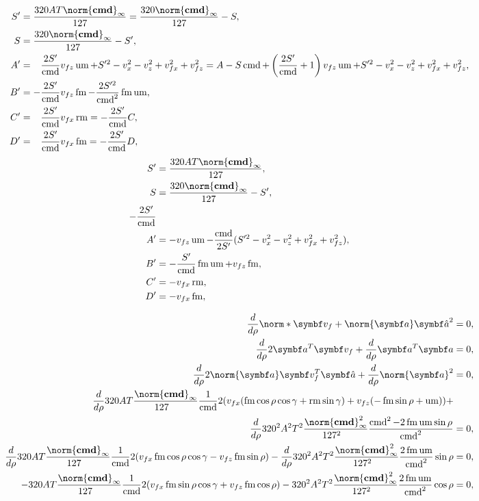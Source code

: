 \begin{align*}
S' &= \frac{320AT\norm{\tvec{\cmd}}_{\infty}}{127} = \frac{320\norm{\tvec{\cmd}}_{\infty}}{127} - S,\\
S &= \frac{320\norm{\tvec{\cmd}}_{\infty}}{127} - S',\\
A' &= \hphantom{-}\frac{2S'}{\cmd}v_{fz}\umove + S'^2 - v_x^2 - v_z^2 + v_{fx}^2 + v_{fz}^2 = A - S\cmd + \left(\frac{2S'}{\cmd} + 1\right)v_{fz}\umove + S'^2 - v_x^2 - v_z^2 + v_{fx}^2 + v_{fz}^2,\\
B' &= -\frac{2S'}{\cmd}v_{fz}\fmove - \frac{2S'^2}{\cmd^2}\fmove\umove,\\
C' &= \hphantom{-}\frac{2S'}{\cmd}v_{fx}\rmove = -\frac{2S'}{\cmd}C,\\
D' &= \hphantom{-}\frac{2S'}{\cmd}v_{fx}\fmove = -\frac{2S'}{\cmd}D,
\end{align*}
\begin{align*}
S' &= \frac{320AT\norm{\tvec{\cmd}}_{\infty}}{127},\\
S &= \frac{320\norm{\tvec{\cmd}}_{\infty}}{127} - S',\\
-\frac{2S'}{\cmd}\\
A' &= -v_{fz}\umove - \frac{\cmd}{2S'}(S'^2 - v_x^2 - v_z^2 + v_{fx}^2 + v_{fz}^2),\\
B' &= -\frac{S'}{\cmd}\fmove\umove + v_{fz}\fmove,\\
C' &= -v_{fx}\rmove,\\
D' &= -v_{fx}\fmove,
\end{align*}

\begin{align*}
\frac{\diff}{\diff\rho}\norm*{\vec{v}_f + \norm{\vec{a}}\uvec{a}}^2 &= 0,\\
\frac{\diff}{\diff\rho}2\vec{a}^T \vec{v}_f + \frac{\diff}{\diff\rho}\vec{a}^T \vec{a} &= 0,\\
\frac{\diff}{\diff\rho}2\norm{\vec{a}} \vec{v}_f^T \uvec{a} + \frac{\diff}{\diff\rho}\norm{\vec{a}}^2 &= 0,\\
\frac{\diff}{\diff\rho}320AT\frac{\norm{\tvec{\cmd}}_{\infty}}{127\hphantom{_{\infty}}} \frac{1}{\cmd}2 (v_{fx}(\fmove \cos\rho\cos\gamma + \rmove \sin\gamma) + v_{fz}(-\fmove \sin\rho + \umove) ) +\\
\frac{\diff}{\diff\rho}320^2 A^2 T^2\frac{\norm{\tvec{\cmd}}^2_{\infty}}{127^2\hphantom{_{\infty}}} \frac{\cmd^2  - 2\fmove\umove\sin\rho}{\cmd^2} &= 0,\\
%
\frac{\diff}{\diff\rho}320AT\frac{\norm{\tvec{\cmd}}_{\infty}}{127\hphantom{_{\infty}}} \frac{1}{\cmd}2 (v_{fx}\fmove \cos\rho\cos\gamma - v_{fz}\fmove \sin\rho ) - \frac{\diff}{\diff\rho}320^2 A^2 T^2\frac{\norm{\tvec{\cmd}}^2_{\infty}}{127^2\hphantom{_{\infty}}} \frac{2\fmove\umove}{\cmd^2}\sin\rho &= 0,\\
-320AT\frac{\norm{\tvec{\cmd}}_{\infty}}{127\hphantom{_{\infty}}} \frac{1}{\cmd}2 (v_{fx}\fmove \sin\rho\cos\gamma + v_{fz}\fmove \cos\rho ) - 320^2 A^2 T^2\frac{\norm{\tvec{\cmd}}^2_{\infty}}{127^2\hphantom{_{\infty}}} \frac{2\fmove\umove}{\cmd^2}\cos\rho &= 0,
\end{align*}

